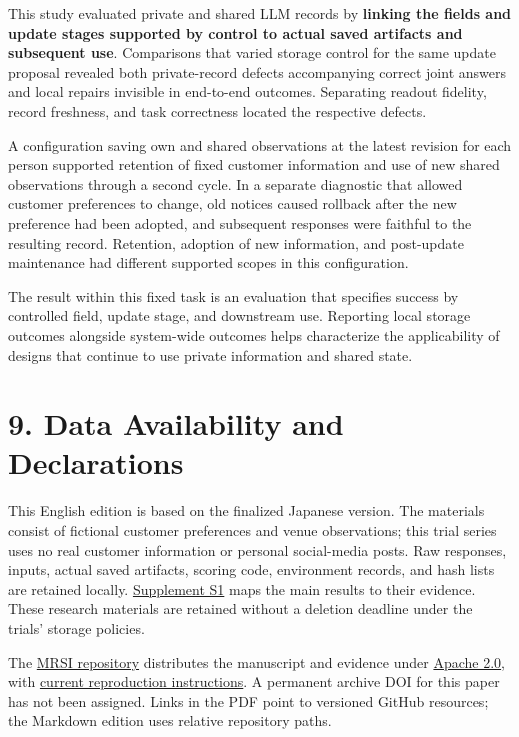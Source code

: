 \documentclass[10pt,a4paper]{article}
\begin{document}
This study evaluated private and shared LLM records by \textbf{linking the fields and update stages supported by control to actual saved artifacts and subsequent use}. Comparisons that varied storage control for the same update proposal revealed both private-record defects accompanying correct joint answers and local repairs invisible in end-to-end outcomes. Separating readout fidelity, record freshness, and task correctness located the respective defects.

A configuration saving own and shared observations at the latest revision for each person supported retention of fixed customer information and use of new shared observations through a second cycle. In a separate diagnostic that allowed customer preferences to change, old notices caused rollback after the new preference had been adopted, and subsequent responses were faithful to the resulting record. Retention, adoption of new information, and post-update maintenance had different supported scopes in this configuration.

The result within this fixed task is an evaluation that specifies success by controlled field, update stage, and downstream use. Reporting local storage outcomes alongside system-wide outcomes helps characterize the applicability of designs that continue to use private information and shared state.

\section{9. Data Availability and Declarations}\label{paper-02-data-availability-and-declarations}

This English edition is based on the finalized Japanese version. The materials consist of fictional customer preferences and venue observations; this trial series uses no real customer information or personal social-media posts. Raw responses, inputs, actual saved artifacts, scoring code, environment records, and hash lists are retained locally. \href{https://github.com/metaSATOKEN/MRSI/blob/9443de315d283874df0c27e0e99b8c04f400709d/papers/paper-02/evidence-index-en-v0.1-2026-09-27.md}{Supplement S1} maps the main results to their evidence. These research materials are retained without a deletion deadline under the trials' storage policies.

The \href{https://github.com/metaSATOKEN/MRSI}{MRSI repository} distributes the manuscript and evidence under \href{https://github.com/metaSATOKEN/MRSI/blob/9443de315d283874df0c27e0e99b8c04f400709d/LICENSE_STATUS.md}{Apache 2.0}, with \href{https://github.com/metaSATOKEN/MRSI/blob/9443de315d283874df0c27e0e99b8c04f400709d/RUNNING.md}{current reproduction instructions}. A permanent archive DOI for this paper has not been assigned. Links in the PDF point to versioned GitHub resources; the Markdown edition uses relative repository paths.
\end{document}
